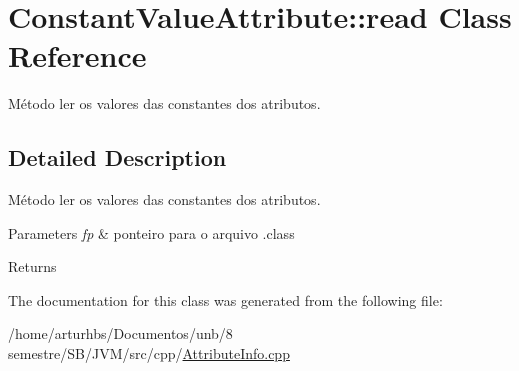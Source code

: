 \hypertarget{classConstantValueAttribute_1_1read}{}\section{Constant\+Value\+Attribute\+:\+:read Class Reference}
\label{classConstantValueAttribute_1_1read}


Método ler os valores das constantes dos atributos.  




\subsection{Detailed Description}
Método ler os valores das constantes dos atributos. 


\begin{DoxyParams}{Parameters}
{\em fp} & ponteiro para o arquivo .class \\
\hline
\end{DoxyParams}
\begin{DoxyReturn}{Returns}

\end{DoxyReturn}


The documentation for this class was generated from the following file\+:\begin{DoxyCompactItemize}
\item 
/home/arturhbs/\+Documentos/unb/8 semestre/\+S\+B/\+J\+V\+M/src/cpp/\hyperlink{AttributeInfo_8cpp}{Attribute\+Info.\+cpp}\end{DoxyCompactItemize}
